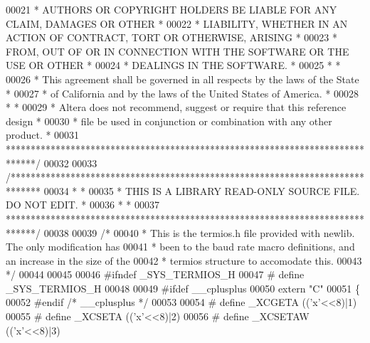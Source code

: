 \begin{DoxyCode}
00021 \textcolor{comment}{* AUTHORS OR COPYRIGHT HOLDERS BE LIABLE FOR ANY CLAIM, DAMAGES OR OTHER      *}
00022 \textcolor{comment}{* LIABILITY, WHETHER IN AN ACTION OF CONTRACT, TORT OR OTHERWISE, ARISING     *}
00023 \textcolor{comment}{* FROM, OUT OF OR IN CONNECTION WITH THE SOFTWARE OR THE USE OR OTHER         *}
00024 \textcolor{comment}{* DEALINGS IN THE SOFTWARE.                                                   *}
00025 \textcolor{comment}{*                                                                             *}
00026 \textcolor{comment}{* This agreement shall be governed in all respects by the laws of the State   *}
00027 \textcolor{comment}{* of California and by the laws of the United States of America.              *}
00028 \textcolor{comment}{*                                                                             *}
00029 \textcolor{comment}{* Altera does not recommend, suggest or require that this reference design    *}
00030 \textcolor{comment}{* file be used in conjunction or combination with any other product.          *}
00031 \textcolor{comment}{******************************************************************************/}
00032 
00033 \textcolor{comment}{/******************************************************************************}
00034 \textcolor{comment}{*                                                                             *}
00035 \textcolor{comment}{* THIS IS A LIBRARY READ-ONLY SOURCE FILE. DO NOT EDIT.                       *}
00036 \textcolor{comment}{*                                                                             *}
00037 \textcolor{comment}{******************************************************************************/}
00038 
00039 \textcolor{comment}{/*}
00040 \textcolor{comment}{ * This is the termios.h file provided with newlib. The only modification has }
00041 \textcolor{comment}{ * been to the baud rate macro definitions, and an increase in the size of the}
00042 \textcolor{comment}{ * termios structure to accomodate this.}
00043 \textcolor{comment}{ */}
00044 
00045 
00046 \textcolor{preprocessor}{#ifndef \_SYS\_TERMIOS\_H}
00047 \textcolor{preprocessor}{# define \_SYS\_TERMIOS\_H}
00048 
00049 \textcolor{preprocessor}{#ifdef \_\_cplusplus}
00050 \textcolor{keyword}{extern} \textcolor{stringliteral}{"C"}
00051 \{
00052 \textcolor{preprocessor}{#endif }\textcolor{comment}{/* \_\_cplusplus */}\textcolor{preprocessor}{}
00053 
00054 \textcolor{preprocessor}{# define \_XCGETA (('x'<<8)|1)}
00055 \textcolor{preprocessor}{# define \_XCSETA (('x'<<8)|2)}
00056 \textcolor{preprocessor}{# define \_XCSETAW (('x'<<8)|3)}

\end{DoxyCode}
